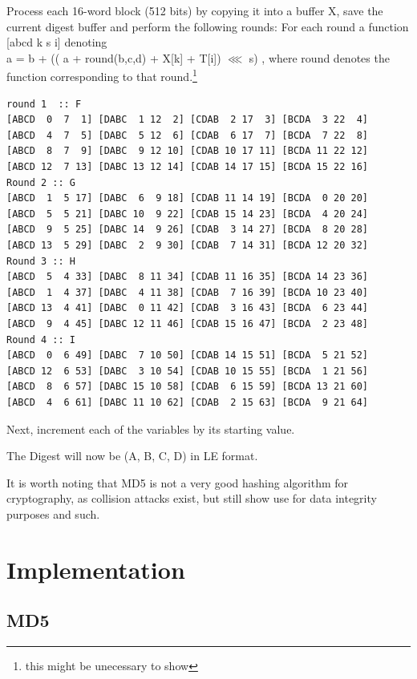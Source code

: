 \documentclass[a4paper]{article}
\begin{document}
Process each 16-word block (512 bits) by copying it into a buffer X,
save the current digest buffer and perform the following rounds:
For each round a function [abcd k s i] denoting\\
a = b + (( a + round(b,c,d) + X[k] + T[i]) \(\lll\) s)
, where round denotes the function corresponding to that round.\footnote{this might be unecessary to show}
\begin{verbatim}
round 1  :: F
[ABCD  0  7  1] [DABC  1 12  2] [CDAB  2 17  3] [BCDA  3 22  4]
[ABCD  4  7  5] [DABC  5 12  6] [CDAB  6 17  7] [BCDA  7 22  8]
[ABCD  8  7  9] [DABC  9 12 10] [CDAB 10 17 11] [BCDA 11 22 12]
[ABCD 12  7 13] [DABC 13 12 14] [CDAB 14 17 15] [BCDA 15 22 16]
Round 2 :: G
[ABCD  1  5 17] [DABC  6  9 18] [CDAB 11 14 19] [BCDA  0 20 20]
[ABCD  5  5 21] [DABC 10  9 22] [CDAB 15 14 23] [BCDA  4 20 24]
[ABCD  9  5 25] [DABC 14  9 26] [CDAB  3 14 27] [BCDA  8 20 28]
[ABCD 13  5 29] [DABC  2  9 30] [CDAB  7 14 31] [BCDA 12 20 32]
Round 3 :: H
[ABCD  5  4 33] [DABC  8 11 34] [CDAB 11 16 35] [BCDA 14 23 36]
[ABCD  1  4 37] [DABC  4 11 38] [CDAB  7 16 39] [BCDA 10 23 40]
[ABCD 13  4 41] [DABC  0 11 42] [CDAB  3 16 43] [BCDA  6 23 44]
[ABCD  9  4 45] [DABC 12 11 46] [CDAB 15 16 47] [BCDA  2 23 48]
Round 4 :: I
[ABCD  0  6 49] [DABC  7 10 50] [CDAB 14 15 51] [BCDA  5 21 52]
[ABCD 12  6 53] [DABC  3 10 54] [CDAB 10 15 55] [BCDA  1 21 56]
[ABCD  8  6 57] [DABC 15 10 58] [CDAB  6 15 59] [BCDA 13 21 60]
[ABCD  4  6 61] [DABC 11 10 62] [CDAB  2 15 63] [BCDA  9 21 64]
\end{verbatim}
Next, increment each of the variables by its starting value.

The Digest will now be (A, B, C, D) in LE format.

It is worth noting that MD5 is not a very good hashing algorithm for cryptography, as collision attacks exist, but still show use for data integrity purposes and such.

\section{Implementation}
\label{sec:org7ed3dfd}
\subsection{MD5}
\label{sec:org68a08b1}
\end{document}
